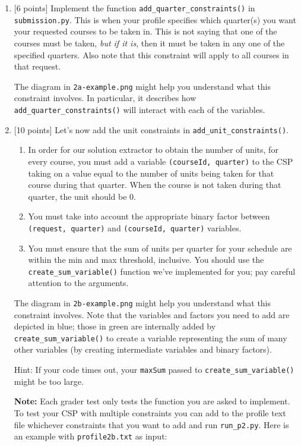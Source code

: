 \documentclass{article}
\theoremstyle{case}
\theoremstyle{definition}
\begin{document}
\begin{enumerate}[label=\alph*.]
\item
{[6 points]} Implement the function \texttt{add\_quarter\_constraints()} in \texttt{submission.py}. This is when your profile specifies which quarter(s) you want your requested courses to be taken in. This is not saying that one of the courses must be taken, \textit{but if it is}, then it must be taken in any one of the specified quarters. Also note that this constraint will apply to all courses in that request. 

The diagram in \texttt{2a-example.png} might help you understand what this constraint involves. In particular, it describes how \texttt{add\_quarter\_constraints()} will interact with each of the variables.

\item
{[10 points]} Let's now add the unit constraints in \texttt{add\_unit\_constraints()}.
\begin{enumerate}[label=\arabic*.]
\item In order for our solution extractor to obtain the number of units, for every course, you must add a variable \texttt{(courseId, quarter)} to the CSP taking on a value equal to the number of units being taken for that course during that quarter. When the course is not taken during that quarter, the unit should be 0.
\item  You must take into account the appropriate binary factor between \texttt{(request, quarter)} and \texttt{(courseId, quarter)} variables. 
\item  You must ensure that the sum of units per quarter for your schedule are within the min and max threshold, inclusive. You should use the \texttt{create\_sum\_variable()} function we've implemented for you; pay careful attention to the arguments.
\end{enumerate}

The diagram in \texttt{2b-example.png} might help you understand what this constraint involves. Note that the variables and factors you need to add are depicted in blue; those in green are internally added by \texttt{create\_sum\_variable()} to create a variable representing the sum of many other variables (by creating intermediate variables and binary factors).

Hint: If your code times out, your \texttt{maxSum} passed to \texttt{create\_sum\_variable()} might be too large.

\textbf{Note:} Each grader test only tests the function you are asked to implement. To test your CSP with multiple constraints you can add to the profile text file whichever constraints that you want to add and run \texttt{run\_p2.py}. Here is an example with \texttt{profile2b.txt} as input: 


\end{enumerate}
\end{document}
